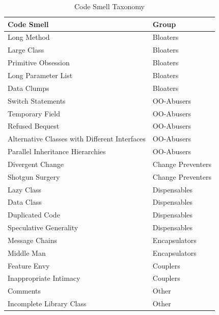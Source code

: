 \begin{table}[]
\centering
\caption{Code Smell Taxonomy}
\label{tab:codesmell}
\begin{tabular}{|l|l|}
\hline
\textbf{Code Smell}                           & \textbf{Group}    \\ \hline
Long Method                                   & Bloaters          \\ \hline
Large Class                                   & Bloaters          \\ \hline
Primitive Obsession                           & Bloaters          \\ \hline
Long Parameter List                           & Bloaters          \\ \hline
Data Clumps                                   & Bloaters          \\ \hline
Switch Statements                             & OO-Abusers       \\ \hline
Temporary Field                               & OO-Abusers       \\ \hline
Refused Bequest                               & OO-Abusers       \\ \hline
Alternative Classes with Different Interfaces & OO-Abusers       \\ \hline
Parallel Inheritance Hierarchies              & OO-Abusers       \\ \hline
Divergent Change                              & Change Preventers \\ \hline
Shotgun Surgery                               & Change Preventers \\ \hline
Lazy Class                                    & Dispensables      \\ \hline
Data Class                                    & Dispensables      \\ \hline
Duplicated Code                               & Dispensables      \\ \hline
Speculative Generality                        & Dispensables      \\ \hline
Message Chains                                & Encapsulators     \\ \hline
Middle Man                                    & Encapsulators     \\ \hline
Feature Envy                                  & Couplers          \\ \hline
Inappropriate Intimacy                        & Couplers          \\ \hline
Comments                                      & Other             \\ \hline
Incomplete Library Class                      & Other             \\ \hline
\end{tabular}
\end{table}

